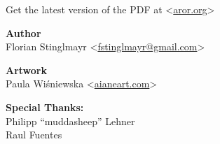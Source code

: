 \onecolumn


\vspace*{\fill}

\begin{center}
  Get the latest version of the PDF at <\href{https://aror.org}{aror.org}>

  \textbf{Author}\\
  Florian Stinglmayr
  <\href{mailto:fstinglmayr@gmail.com}{fstinglmayr@gmail.com}>

  \textbf{Artwork}\\
  Paula Wiśniewska
  <\href{http://aianeart.com}{aianeart.com}>

  \textbf{Special Thanks:}\\
  Philipp ``muddasheep'' Lehner\\
  Raul Fuentes
\end{center}

\twocolumn
\newpage
